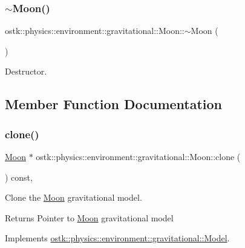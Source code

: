 \subsubsection{\texorpdfstring{$\sim$\+Moon()}{~Moon()}}
{\footnotesize\ttfamily ostk\+::physics\+::environment\+::gravitational\+::\+Moon\+::$\sim$\+Moon (\begin{DoxyParamCaption}{ }\end{DoxyParamCaption})}



Destructor. 



\subsection{Member Function Documentation}
\mbox{\label{classostk_1_1physics_1_1environment_1_1gravitational_1_1_moon_a264078001de13a1f35297a87a7c3abec}} 
\subsubsection{\texorpdfstring{clone()}{clone()}}
{\footnotesize\ttfamily \hyperlink{classostk_1_1physics_1_1environment_1_1gravitational_1_1_moon}{Moon} $\ast$ ostk\+::physics\+::environment\+::gravitational\+::\+Moon\+::clone (\begin{DoxyParamCaption}{ }\end{DoxyParamCaption}) const\hspace{0.3cm}{\ttfamily [override]}, {\ttfamily [virtual]}}



Clone the \hyperlink{classostk_1_1physics_1_1environment_1_1gravitational_1_1_moon}{Moon} gravitational model. 

\begin{DoxyReturn}{Returns}
Pointer to \hyperlink{classostk_1_1physics_1_1environment_1_1gravitational_1_1_moon}{Moon} gravitational model 
\end{DoxyReturn}


Implements \hyperlink{classostk_1_1physics_1_1environment_1_1gravitational_1_1_model_a399257ac86e7f0112a702141e0e2e4a7}{ostk\+::physics\+::environment\+::gravitational\+::\+Model}.

